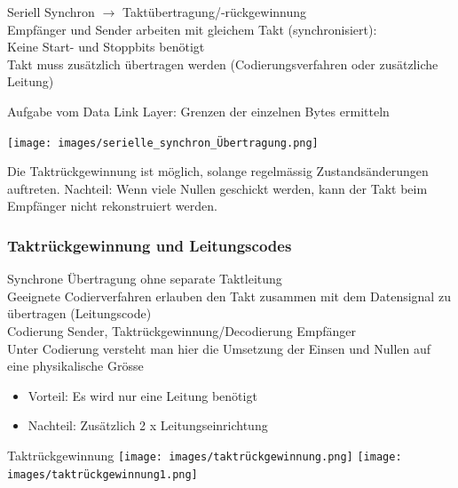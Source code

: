 \begin{definition}{Seriell Synchron} $\rightarrow$ Taktübertragung/-rückgewinnung \\
    Empfänger und Sender arbeiten mit gleichem Takt (synchronisiert): \\
    Keine Start- und Stoppbits benötigt\\
    Takt muss zusätzlich übertragen werden (Codierungsverfahren oder zusätzliche Leitung)
    
    \vspace{1mm}

    {\small Aufgabe vom Data Link Layer: Grenzen der einzelnen Bytes ermitteln}

    \texttt{[image: images/serielle\_synchron\_Übertragung.png]}
    
    Die Taktrückgewinnung ist möglich, solange regelmässig Zustandsänderungen auftreten. Nachteil: 
    Wenn viele Nullen geschickt werden, kann der Takt beim Empfänger nicht rekonstruiert werden. 
\end{definition}






\subsubsection{Taktrückgewinnung und Leitungscodes}

\begin{definition}{Synchrone Übertragung ohne separate Taktleitung}\\
    Geeignete Codierverfahren erlauben den Takt zusammen mit dem Datensignal zu übertragen (Leitungscode)\\
    Codierung Sender, Taktrückgewinnung/Decodierung Empfänger\\
    Unter Codierung versteht man hier die Umsetzung der Einsen und Nullen auf eine physikalische Grösse
    \begin{itemize}
        \item Vorteil: Es wird nur eine Leitung benötigt
        \item Nachteil: Zusätzlich 2 x Leitungseinrichtung
    \end{itemize}
\end{definition}

\begin{concept}{Taktrückgewinnung}
    \center
    \texttt{[image: images/taktrückgewinnung.png]}
    \center
    \texttt{[image: images/taktrückgewinnung1.png]}
\end{concept}

